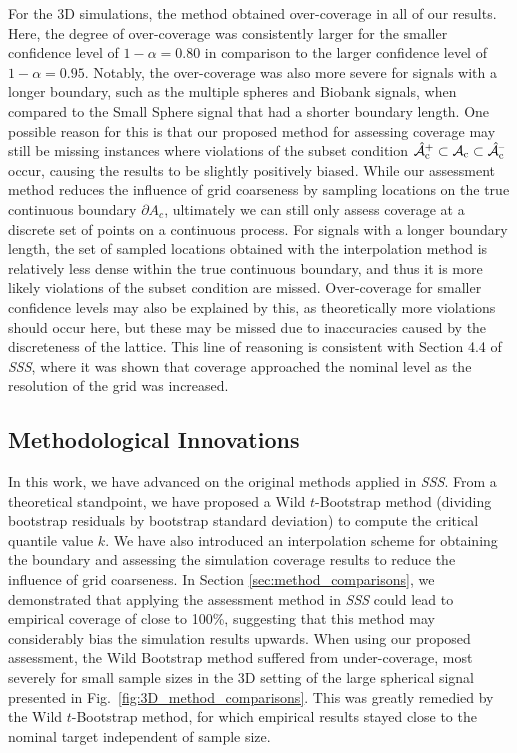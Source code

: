 For the 3D simulations, the method obtained over-coverage in all of our results. Here, the degree of over-coverage was consistently larger for the smaller confidence level of $1 - \alpha = 0.80$ in comparison to the larger confidence level of $1- \alpha = 0.95$. Notably, the over-coverage was also more severe for signals with a longer boundary, such as the multiple spheres and Biobank signals, when compared to the Small Sphere signal that had a shorter boundary length. One possible reason for this is that our proposed method for assessing coverage may still be missing instances where violations of the subset condition $\operatorname{\hat{\mathcal{A}}_{c}^+} \subset \operatorname{\mathcal{A}_{c}} \subset \operatorname{\hat{\mathcal{A}}_{c}^{\textrm{--}}}$ occur, causing the results to be slightly positively biased. While our assessment method reduces the influence of grid coarseness by sampling locations on the true continuous boundary $\partial A_c$, ultimately we can still only assess coverage at a discrete set of points on a continuous process. For signals with a longer boundary length, the set of sampled locations obtained with the interpolation method is relatively less dense within the true continuous boundary, and thus it is more likely violations of the subset condition are missed. Over-coverage for smaller confidence levels may also be explained by this, as theoretically more violations should occur here, but these may be missed due to inaccuracies caused by the discreteness of the lattice. This line of reasoning is consistent with Section 4.4 of \textit{SSS}, where it was shown that coverage approached the nominal level as the resolution of the grid was increased.

\subsection{Methodological Innovations}
\label{sec:discussion_innovations}
In this work, we have advanced on the original methods applied in \textit{SSS}. From a theoretical standpoint, we have proposed a Wild $t$-Bootstrap method (dividing bootstrap residuals by bootstrap standard deviation) to compute the critical quantile value $k$. We have also introduced an interpolation scheme for obtaining the boundary and assessing the simulation coverage results to reduce the influence of grid coarseness. In Section \ref{sec:method_comparisons}, we demonstrated that applying the assessment method in \textit{SSS} could lead to empirical coverage of close to 100\%, suggesting that this method may considerably bias the simulation results upwards. When using our proposed assessment, the Wild Bootstrap method suffered from under-coverage, most severely for small sample sizes in the 3D setting of the large spherical signal presented in Fig.\ \ref{fig:3D_method_comparisons}. This was greatly remedied by the Wild $t$-Bootstrap method, for which empirical results stayed close to the nominal target independent of sample size.

